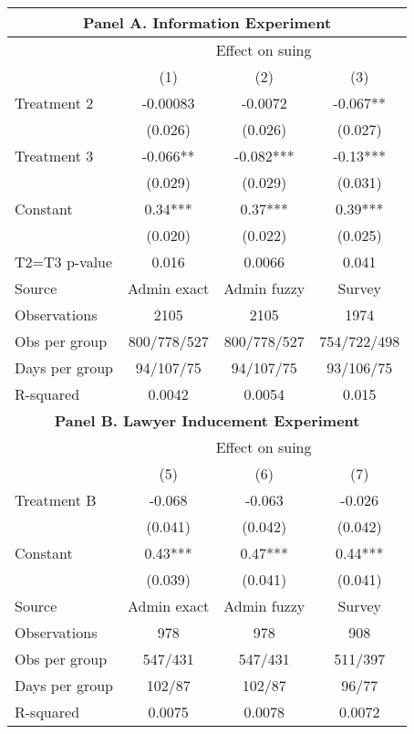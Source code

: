 \begin{tabular}{lccc}
\toprule
\toprule
\multicolumn{4}{c}{\textbf{Panel A. Information Experiment}} \\
\midrule
      & \multicolumn{3}{c}{Effect on suing} \\
\midrule
      & (1)   & (2)   & (3) \\
\midrule
Treatment 2 & -0.00083 & -0.0072 & -0.067** \\
      & (0.026) & (0.026) & (0.027) \\
Treatment 3 & -0.066** & -0.082*** & -0.13*** \\
      & (0.029) & (0.029) & (0.031) \\
Constant & 0.34*** & 0.37*** & 0.39*** \\
      & (0.020) & (0.022) & (0.025) \\
T2=T3 p-value & 0.016 & 0.0066 & 0.041 \\
\midrule
Source & Admin exact & Admin fuzzy & Survey \\
Observations & 2105  & 2105  & 1974 \\
Obs per group & 800/778/527 & 800/778/527 & 754/722/498 \\
Days per group & 94/107/75 & 94/107/75 & 93/106/75 \\
R-squared & 0.0042 & 0.0054 & 0.015 \\
\midrule
\midrule
\multicolumn{4}{c}{\textbf{Panel B. Lawyer Inducement Experiment}} \\
\midrule
      & \multicolumn{3}{c}{Effect on suing} \\
\midrule
      & (5)   & (6)   & (7) \\
\midrule
Treatment B & -0.068 & -0.063 & -0.026 \\
      & (0.041) & (0.042) & (0.042) \\
Constant & 0.43*** & 0.47*** & 0.44*** \\
      & (0.039) & (0.041) & (0.041) \\
\midrule
Source & Admin exact & Admin fuzzy & Survey \\
Observations & 978   & 978   & 908 \\
Obs per group & 547/431 & 547/431 & 511/397 \\
Days per group & 102/87 & 102/87 & 96/77 \\
R-squared & 0.0075 & 0.0078 & 0.0072 \\
\bottomrule
\end{tabular}%
